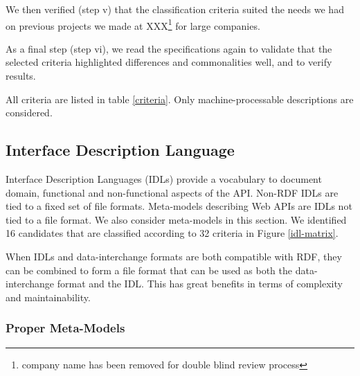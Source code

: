 We then verified (step v) that the classification criteria suited the needs we had on previous projects we made at  XXX\footnote{company name has been removed for double blind review process} for large companies. 

As a final step (step vi), we read the specifications again to validate that the selected criteria highlighted differences and commonalities well, and to verify results.

All criteria are listed in table \ref{criteria}. Only machine-processable descriptions are considered.



\subsection{Interface Description Language}




Interface Description Languages (IDLs) provide a vocabulary to document domain, functional and non-functional aspects of the API. Non-RDF IDLs are tied to a fixed set of file formats. Meta-models describing Web APIs are IDLs not tied to a file format. We also consider meta-models in this section. We identified 16 candidates that are classified according to 32 criteria in Figure \ref{idl-matrix}.

When IDLs and data-interchange formats are both compatible with RDF, they can be combined to form a file format that can be used as both the data-interchange format and the IDL. This has great benefits in terms of complexity and maintainability.

\subsubsection{Proper Meta-Models}

